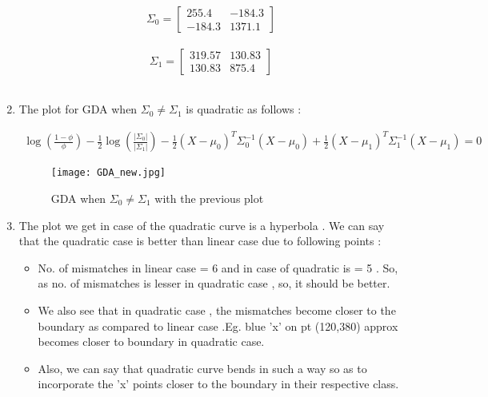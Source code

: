 \documentclass{article}
\begin{document}
\begin{enumerate}[label=(\alph*)]
                                \[
                        \Sigma _0 =
                          \begin{bmatrix}
                           255.4 & -184.3 \\
                            -184.3 & 1371.1
                           
                          \end{bmatrix}
                        \]
                        \\
                        
                         \[
                        \Sigma _1 =
                          \begin{bmatrix}
                           319.57 & 130.83 \\
                            130.83 & 875.4
                           
                          \end{bmatrix}
                        \]
                        \\
                        
                        
    \item The plot for GDA when $\Sigma _0  \neq \Sigma _1$  is quadratic as follows :
    
          \begin{align*}
           \log(\frac{1-\phi}{\phi}) - \frac{1}{2}\log( \frac{|\Sigma _0|}{|\Sigma _1|}) - \frac{1}{2}(X-\mu _0)^T\Sigma _0^{-1}(X-\mu _0) + \frac{1}{2}(X-\mu _1)^T\Sigma _1^{-1}(X-\mu _1) = 0
        \end{align*}  
        \begin{figure}[H]
            \centering
            \texttt{[image: GDA\_new.jpg]}
            \caption{GDA when $\Sigma _0 \neq \Sigma _1$ with the previous plot  }
            \label{Linear_Reg_Cont_13}
         \end{figure}
         
         
    \item The plot we get in case of the quadratic curve is a hyperbola . We can say that the quadratic case is better than linear case due to following points :
    \begin{itemize}
        \item No. of mismatches in linear case = 6 and in case of quadratic is = 5 . So, as no. of mismatches is lesser in quadratic case , so, it should be better.
        \item We also see that in quadratic case , the mismatches become closer to the boundary as compared to linear case .Eg. blue 'x' on pt (120,380) approx becomes closer to boundary in quadratic case.
        \item Also, we can say that quadratic curve bends in such a way so as to incorporate  the 'x' points closer to the boundary in their respective class. 
    \end{itemize}
    
    
    
    
\end{enumerate}
\end{document}
